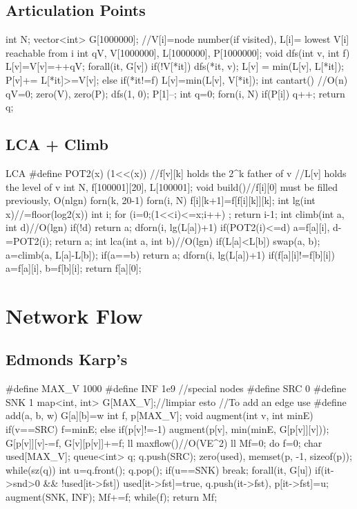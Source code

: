 \documentclass[10pt,landscape,twocolumn,a4paper,notitlepage]{article}
\begin{document}
\subsection{Articulation Points}
\begin{code}
int N;
vector<int> G[1000000];
//V[i]=node number(if visited), L[i]= lowest V[i] reachable from i
int qV, V[1000000], L[1000000], P[1000000];
void dfs(int v, int f){
	L[v]=V[v]=++qV;
	forall(it, G[v])
		if(!V[*it]){
			dfs(*it, v);
			L[v] = min(L[v], L[*it]);
			P[v]+= L[*it]>=V[v];
		}
		else if(*it!=f)
			L[v]=min(L[v], V[*it]);
}
int cantart(){ //O(n)
	qV=0;
	zero(V), zero(P);
	dfs(1, 0); P[1]--;
	int q=0;
	forn(i, N) if(P[i]) q++;
return q;
}
\end{code}
\subsection{LCA + Climb}
\begin{code}
LCA
#define POT2(x) (1<<(x))
//f[v][k] holds the 2^k father of v
//L[v] holds the level of v
int N, f[100001][20], L[100001];
void build(){//f[i][0] must be filled previously, O(nlgn)
	forn(k, 20-1) forn(i, N) f[i][k+1]=f[f[i][k]][k];}
int lg(int x){//=floor(log2(x))
	int i;
	for (i=0;(1<<i)<=x;i++) ;
	return i-1;
}
int climb(int a, int d){//O(lgn)
	if(!d) return a;
	dforn(i, lg(L[a])+1)
		if(POT2(i)<=d)
			a=f[a][i], d-=POT2(i);
    return a;
}
int lca(int a, int b){//O(lgn)
	if(L[a]<L[b]) swap(a, b);
	a=climb(a, L[a]-L[b]);
	if(a==b) return a;
	dforn(i, lg(L[a])+1)
		if(f[a][i]!=f[b][i])
			a=f[a][i], b=f[b][i];
	return f[a][0];
}
\end{code}
\section{Network Flow}
\subsection{Edmonds Karp’s}
\begin{code}
#define MAX_V 1000
#define INF 1e9
//special nodes
#define SRC 0
#define SNK 1
map<int, int> G[MAX_V];//limpiar esto
//To add an edge use
#define add(a, b, w) G[a][b]=w
int f, p[MAX_V];
void augment(int v, int minE){
	if(v==SRC) f=minE;
	else if(p[v]!=-1){
		augment(p[v], min(minE, G[p[v]][v]));
		G[p[v]][v]-=f, G[v][p[v]]+=f;
	}
}
ll maxflow(){//O(VE^2)
	ll Mf=0;
	do{
		f=0;
		char used[MAX_V]; queue<int> q; q.push(SRC);
		zero(used), memset(p, -1, sizeof(p));
		while(sz(q)){
			int u=q.front(); q.pop();
			if(u==SNK) break;
			forall(it, G[u])
				if(it->snd>0 && !used[it->fst])
					used[it->fst]=true, q.push(it->fst), p[it->fst]=u;
		}
		augment(SNK, INF);
		Mf+=f;
	}while(f);
	return Mf;
}
\end{code}
\end{document}
